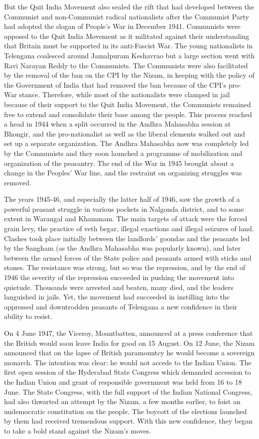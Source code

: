 But the Quit India Movement also sealed the rift that had developed between the Communist and non-Communist radical nationalists after the Communist Party had adopted the slogan of People's War in December 1941. Communists were opposed to the Quit India Movement as it militated against their understanding that Britain must be supported in its anti-Fascist War. The young nationalists in Telengana coalesced around Jamalpuram Keshavrao but a large section went with Ravi Narayan Reddy to the Communists. The Communists were also facilitated by the removal of the ban on the CPI by the Nizam, in keeping with the policy of the Government of India that had removed the ban because of the CPI's pro- War stance. Therefore, while most of the nationalists were clamped in jail because of their support to the Quit India Movement, the Communists remained free to extend and consolidate their base among the people. This process reached a head in 1944 when a split occurred in the Andhra Mahasabha session at Bhongir, and the pro-nationalist as well as the liberal elements walked out and set up a separate organization. The Andhra Mahasabha now was completely led by the Communists and they soon launched a programme of mobilization and organization of the peasantry. The end of the War in 1945 brought about a change in the Peoples' War line, and the restraint on organizing struggles was removed. 

The years 1945-46, and especially the latter half of 1946, saw the growth of a powerful peasant struggle in various pockets in Nalgonda district, and to some extent in Warangal and Khammam. The main targets of attack were the forced grain levy, the practice of veth begar, illegal exactions and illegal seizures of land. Clashes took place initially between the landlords' goondas and the peasants led by the Sangham (as the Andhra Mahasabha was popularly known), and later between the armed forces of the State police and peasants armed with sticks and stones. The resistance was strong, but so was the repression, and by the end of 1946 the severity of the repression succeeded in pushing the movement into quietude. Thousands were arrested and beaten, many died, and the leaders languished in jails. Yet, the movement had succeeded in instilling into the oppressed and downtrodden peasants of Telengana a new confidence in their ability to resist. 

On 4 June 1947, the Viceroy, Mountbatten, announced at a press conference that the British would soon leave India for good on 15 August. On 12 June, the Nizam announced that on the lapse of British paramountcy he would become a sovereign monarch. The intention was clear: he would not accede to the Indian Union. The first open session of the Hyderabad State Congress which demanded accession to the Indian Union and grant of responsible government was held from 16 to 18 June. The State Congress, with the full support of the Indian National Congress, had also thwarted an attempt by the Nizam. a few months earlier, to foist an undemocratic constitution on the people. The boycott of the elections launched by them had received tremendous support. With this new confidence, they began to take a bold stand against the Nizam's moves. 

